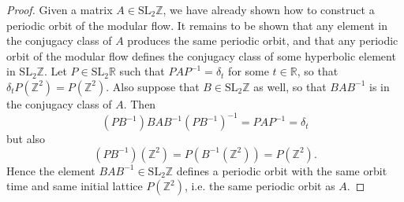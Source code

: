 \documentclass[12pt,twoside]{reedthesis}
\theoremstyle{definition}
\newcommand{\Z}{\mathbb{Z}}
\newcommand{\R}{\mathbb{R}}
\newcommand{\SLZ}{\mathrm{SL}_2{\Z}}
\newcommand{\SLR}{\mathrm{SL}_2{\R}}
\begin{document}
\begin{proof}
  Given a matrix $A \in \SLZ$, we have already shown how to construct a periodic orbit of the modular flow.
  It remains to be shown that any element in the conjugacy class of $A$ produces the same periodic orbit, and that any periodic orbit of the modular flow defines the conjugacy class of some hyperbolic element in $\SLZ$.
  Let $P \in \SLR$ such that $PAP^{-1} = \delta_t$ for some $t \in \R$, so that $\delta_t P(\Z^2) = P(\Z^2)$.
  Also suppose that $B \in \SLZ$ as well, so that $BAB^{-1}$ is in the conjugacy class of $A$.
  Then
  \begin{equation*}
    (PB^{-1}) BAB^{-1} (PB^{-1})^{-1} = PAP^{-1} = \delta_t
  \end{equation*}
  but also
  \begin{equation*}
    (PB^{-1})(\Z^2) = P(B^{-1} (\Z^2)) = P(\Z^2).
  \end{equation*}
  Hence the element $BAB^{-1} \in \SLZ$ defines a periodic orbit with the same orbit time and same initial lattice $P(\Z^2)$, i.e. the same periodic orbit as $A$.


\end{proof}
\end{document}
